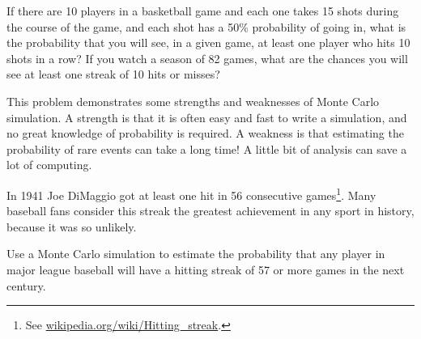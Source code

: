 \documentclass[12pt]{book}
\begin{document}
\begin{ex}

If there are 10 players in a basketball game and each one takes
15 shots during the course of the game, and each shot has a
50\% probability of going in, what is the probability that 
you will see, in a given game, at least one player who
hits 10 shots in a row?  If you watch a season of 82 games,
what are the chances you will see at least one streak of
10 hits or misses?

This problem demonstrates some strengths and weaknesses of Monte
Carlo simulation.  A strength is that it is often easy and fast
to write a simulation, and no great knowledge of probability is
required.  A weakness is that estimating the probability of
rare events can take a long time!  A little bit of analysis can
save a lot of computing.

\end{ex}


\begin{ex}

In 1941 Joe DiMaggio got at least one hit
in 56 consecutive games\footnote{See
  \url{wikipedia.org/wiki/Hitting_streak}.}.  Many baseball fans
consider this streak the greatest achievement in any sport in history,
because it was so unlikely.

Use a Monte Carlo simulation to estimate the probability that
any player in major league baseball will have a hitting streak
of 57 or more games in the next century.

\end{ex}
\end{document}
